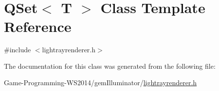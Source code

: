\hypertarget{class_q_set}{}\section{Q\+Set$<$ T $>$ Class Template Reference}
\label{class_q_set}


{\ttfamily \#include $<$lightrayrenderer.\+h$>$}



The documentation for this class was generated from the following file\+:\begin{DoxyCompactItemize}
\item 
Game-\/\+Programming-\/\+W\+S2014/gem\+Illuminator/\hyperlink{lightrayrenderer_8h}{lightrayrenderer.\+h}\end{DoxyCompactItemize}

